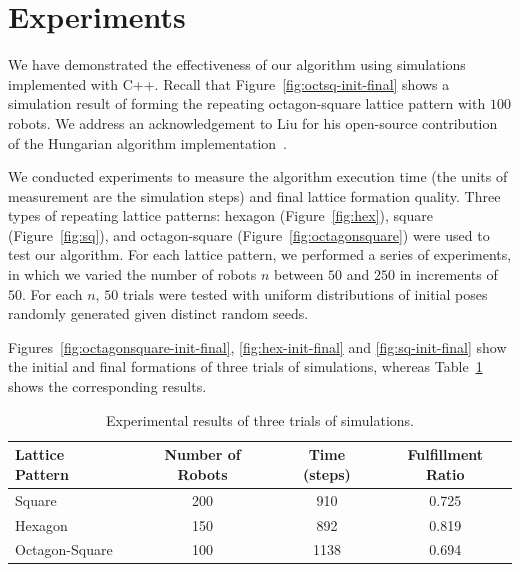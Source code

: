 \section{Experiments}
\label{sec:mrf-exp}
We have demonstrated the effectiveness of our algorithm using simulations implemented with C++. 
%
Recall that Figure~\ref{fig:octsq-init-final} shows a simulation result of forming the repeating octagon-square lattice pattern with $100$ robots.
%
We address an acknowledgement to Liu for his open-source contribution of the Hungarian algorithm implementation~\cite{LiuShe11, LiuShe12a}.


We conducted experiments to measure the algorithm execution time (the units of measurement are the simulation steps) and final lattice formation quality. 
%
Three types of repeating lattice patterns: hexagon (Figure~\ref{fig:hex}), square (Figure~\ref{fig:sq}), and octagon-square (Figure~\ref{fig:octagonsquare}) were used to test our algorithm.
%
For each lattice pattern, we performed a series of experiments, in which we varied the number of robots $n$ between $50$ and $250$ in increments of $50$.  
%
For each $n$, $50$ trials were tested with uniform distributions of initial poses randomly generated given distinct random seeds.

Figures~\ref{fig:octagonsquare-init-final}, \ref{fig:hex-init-final} and \ref{fig:sq-init-final} show the initial and final formations of three trials of simulations, whereas Table~\ref{tab:mrf1-exp-data} shows the corresponding results.
%

\begin{table}
  \small\centering
  \caption{Experimental results of three trials of simulations.}
    \begin{tabular}{lccc} 
    \toprule 
    \textbf{Lattice Pattern} & \textbf{Number of Robots} & \textbf{Time (steps)} & \textbf{Fulfillment Ratio} \\
    \midrule
    Square & 200 & 910 & 0.725  \\ 
    \midrule
    Hexagon & 150 & 892 & 0.819 \\
    \midrule
    Octagon-Square & 100 & 1138 & 0.694 \\
    \bottomrule     
    \end{tabular}
    \label{tab:mrf1-exp-data}
\end{table}

